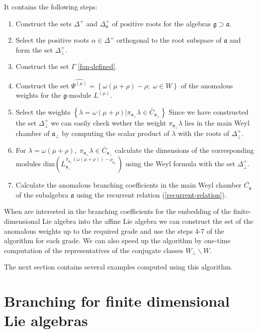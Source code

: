 \documentclass[12pt]{iopart}
\begin{document}
It contains the following steps:
\begin{enumerate}
\item Construct the sets $\Delta^{+}$ and $\Delta_{\mathfrak{a}}^{+}$ of positive roots for the algebras $\mathfrak{g} \supset \mathfrak{a}$.
\item Select the positive roots $\alpha\in \Delta^{+}$ orthogonal to the root subspace of $\mathfrak{a}$ and form the set $\Delta^{+}_{\bot}$.
\item Construct the set $\Gamma$ \ref{fan-defined}.
\item Construct the set $\widehat{\Psi^{(\mu)}}=\left\{\omega(\mu+\rho)-\rho;\; \omega\in W\right\}$ of the anomalous weights for the $\mathfrak{g}$-module $L^{(\mu)}$.
\item Select the weights $\left\{ \lambda=\omega(\mu+\rho) | \pi_{\mathfrak{a}_{\bot}}\lambda \in \bar{C}_{\mathfrak{a}_{\bot}} \right\}$ Since we have constructed the set $\Delta^{+}_{\bot}$ we can easily check wether the weight $\pi_{\mathfrak{a}_{\bot}}\lambda$ lies in the main Weyl chamber of $\mathfrak{a}_{\bot}$ by computing the scalar product of $\lambda$ with the roots of $\Delta^{+}_{\bot}$.
\item For $\lambda=\omega(\mu+\rho),\; \pi_{\mathfrak{a}_{\bot}}\lambda\in \bar{C}_{\mathfrak{a}_{\bot}}$ calculate the dimensions of the corresponding modules $\mathrm{dim}\left(L^{\pi_{\mathfrak{a}_{\bot}}(\omega(\mu+\rho))-\rho_{\mathfrak{a}_{\bot}}}_{\mathfrak{a}_{\bot}}\right)$ using the Weyl formula with the set $\Delta^{+}_{\bot}$.
\item Calculate the anomalous branching coefficients in the main Weyl
  chamber $\bar{C_{\mathfrak{a}}}$ of the subalgebra $\mathfrak{a}$ using the recurrent relation (\ref{recurrent-relation}).
\end{enumerate}

When are interested in the branching coefficients for the embedding of the finite-dimensional Lie algebra into the affine Lie algebra we can construct the set of the anomalous weights up to the required grade and use the steps 4-7 of the algorithm for each grade. We can also speed up the algorithm by one-time computation of the representatives of the conjugate classes $W_{\bot}\backslash W$.

The next section contains several examples computed using this algorithm.

\section{Branching for finite dimensional Lie algebras}
\label{sec:finite-dimens-lie}
\end{document}
